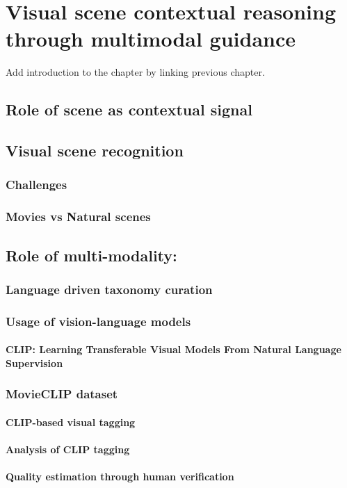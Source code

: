 \chapter{Visual scene contextual reasoning through multimodal guidance}
Add introduction to the chapter by linking previous chapter.
\section{Role of scene as contextual signal}
\section{Visual scene recognition}
\subsection{Challenges}
\subsection{Movies vs Natural scenes}
\section{Role of multi-modality:}
    \subsection{Language driven taxonomy curation}
    \subsection{Usage of vision-language models}
    \subsubsection{CLIP: Learning Transferable Visual Models From Natural Language Supervision}
    \subsection{MovieCLIP dataset}
    \subsubsection{CLIP-based visual tagging}
    \subsubsection{Analysis of CLIP tagging}
    \subsubsection{Quality estimation through human verification}
